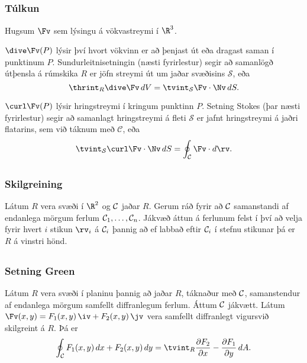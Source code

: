 \subsection{} 

\subsubsection{Túlkun \rtask{}}
 Hugsum $\Fv$ sem lýsingu á vökvastreymi í $\R^3$.

$\dive \Fv(P)$ lýsir því hvort vökvinn er að þenjast út eða dragast
saman í punktinum $P$.  Sundurleitnisetningin (næsti fyrirlestur)
segir að samanlögð útþensla á rúmskika $R$ er jöfn streymi út um jaðar svæðisins $\mathcal{S}$,
eða 
$$\thrint_R\dive\Fv\,dV=\tvint_{\mathcal{S}} \Fv\cdot\Nv\,dS.$$

$\curl \Fv(P)$ lýsir hringstreymi í kringum punktinn $P$.  Setning
Stokes (þar næsti fyrirlestur) segir að samanlagt hringstreymi á fleti $\mathcal{S}$
er jafnt hringstreymi á jaðri flatarins, sem við táknum með $\mathcal{C}$, eða
$$\tvint_{\cal S} \curl\Fv\cdot\Nv\,dS=\oint_\mathcal{C} \Fv\cdot d\rv.$$






\subsection{} 

\subsubsection{Skilgreining \rtask{}}
 Látum $R$ vera svæði í $\R^2$ og $\cal C$
jaðar $R$.  Gerum ráð fyrir að $\cal C$ samanstandi af endanlega
mörgum ferlum ${\cal C}_1, \ldots, {\cal C}_n$.  Jákvæð áttun á
ferlunum felst í því að velja fyrir hvert $i$ stikun $\rv_i$ á ${\cal
  C}_i$ þannig að ef labbað eftir ${\cal C}_i$ í stefnu stikunar þá er
$R$ á vinstri hönd.






\subsection{} 

\subsubsection{Setning Green \rtask{}}
  Látum $R$ vera svæði í planinu þannig að
jaðar $R$, táknaður með $\cal C$,  
samanstendur af endanlega mörgum samfellt diffranlegum
ferlum.  Áttum $\cal C$ jákvætt.  Látum
$\Fv(x,y)=F_1(x,y)\,\iv+F_2(x,y)\,\jv$ vera samfellt diffranlegt
vigursvið skilgreint á $R$.  Þá er 
$$\oint_{\cal C}F_1(x,y)\,dx+F_2(x,y)\,dy=\tvint_R
\frac{\partial  F_2}{\partial x}- 
\frac{\partial  F_1}{\partial y}\,dA.$$






